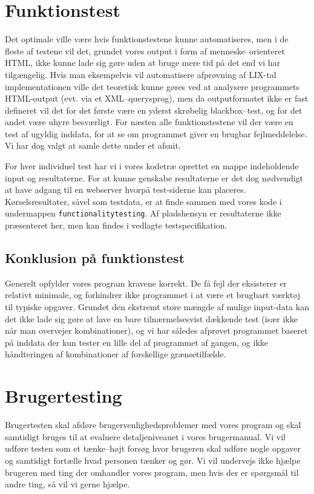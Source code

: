 \documentclass[a4paper,oneside]{memoir}
\begin{document}
\section{Funktionstest}
\label{funktionstests}
Det optimale ville være hvis funktionstestene kunne automatiseres, men
i de fleste af testene vil det, grundet vores output i form af
menneske--orienteret HTML, ikke kunne lade sig gøre uden at bruge mere
tid på det end vi har tilgængelig. Hvis man eksempelvis vil
automatisere afprøvning af LIX-tal implementationen ville det
teoretisk kunne gøres ved at analysere programmets HTML-output
(evt. via et XML--querysprog), men da outputformatet ikke er fast
defineret vil det for det første være en yderst skrøbelig
blackbox--test, og for det andet være uhyre besværligt. For næsten
alle funktionstestene vil der være en test af ugyldig inddata, for at
se om programmet giver en brugbar fejlmeddelelse. Vi har dog valgt at
samle dette under et afsnit.

For hver individuel test har vi i vores kodetræ oprettet en mappe
indeholdende input og resultaterne. For at kunne genskabe resultaterne
er det dog nødvendigt at have adgang til en webserver hvorpå
test-siderne kan placeres. Kørselsresultater, såvel som testdata, er
at finde sammen med vores kode i undermappen
\texttt{functionalitytesting}. Af pladshensyn er resultaterne ikke
præsenteret her, men kan findes i vedlagte testspecifikation.

\subsection{Konklusion på funktionstest}

Generelt opfylder vores program kravene korrekt. De få fejl der
eksisterer er relativt minimale, og forhindrer ikke programmet i at
være et brugbart værktøj til typiske opgaver. Grundet den ekstremt
store mængde af mulige input-data kan det ikke lade sig gøre at lave
en bare tilnærmelsesvist dækkende test (især ikke når man overvejer
kombinationer), og vi har således afprøvet programmet baseret på
inddata der kun tester en lille del af programmet af gangen, og ikke
håndteringen af kombinationer af forskellige grænsetilfælde.

\section{Brugertesting}
\label{brugertesting}
Brugertesten skal afsløre brugervenlighedsproblemer med vores program
og skal samtidigt bruges til at evaluere detaljeniveauet i vores
brugermanual. Vi vil udføre testen som et tænke--højt forsøg hvor
brugeren skal udføre nogle opgaver og samtidigt fortælle hvad personen
tænker og gør. Vi vil undervejs ikke hjælpe brugeren med ting der
omhandler vores program, men hvis der er spørgsmål til andre ting, så
vil vi gerne hjælpe.
\end{document}
